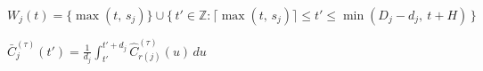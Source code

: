 $W_j(t) = \bigl\{ \max(t,\, s_j) \bigr\} \cup \bigl\{\, t' \in \mathbb{Z} : \lceil \max(t,\, s_j) \rceil \le t' \le \min(D_j - d_j,\ t + H) \,\bigr\}$

$\bar{C}_j^{(\tau)}(t') = \frac{1}{d_j} \int_{t'}^{t' + d_j} \hat{C}_{r(j)}^{(\tau)}(u)\, du$


%
%
%
%
%
%
